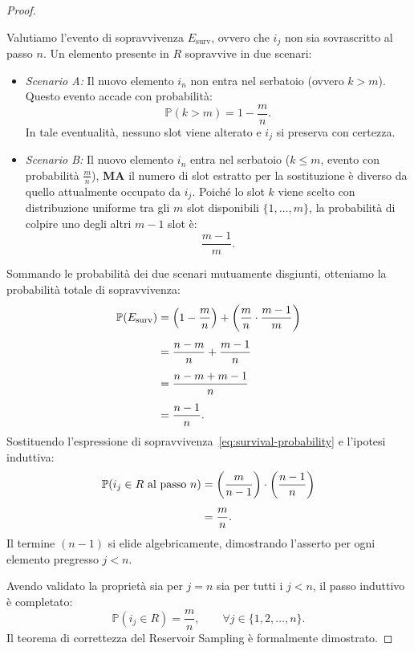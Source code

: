 \begin{proof}
\begin{itemize}
  Valutiamo l'evento di sopravvivenza $E_{\text{surv}}$, ovvero che $i_j$ non sia sovrascritto al passo $n$. Un elemento presente in $R$ sopravvive in due scenari:
  \begin{itemize}
    \item \emph{Scenario A:} Il nuovo elemento $i_n$ non entra nel serbatoio (ovvero $k > m$). Questo evento accade con probabilità:
    \begin{equation}
      \mathbb{P}(k > m) = 1 - \frac{m}{n}.
    \end{equation}
    In tale eventualità, nessuno slot viene alterato e $i_j$ si preserva con certezza.
    \item \emph{Scenario B:} Il nuovo elemento $i_n$ entra nel serbatoio ($k \le m$, evento con probabilità $\frac{m}{n}$), \textbf{MA} il numero di slot estratto per la sostituzione è diverso da quello attualmente occupato da $i_j$. Poiché lo slot $k$ viene scelto con distribuzione uniforme tra gli $m$ slot disponibili $\{1, \dots, m\}$, la probabilità di colpire uno degli altri $m - 1$ slot è:
    \begin{equation}
      \frac{m - 1}{m}.
    \end{equation}
  \end{itemize}
  Sommando le probabilità dei due scenari mutuamente disgiunti, otteniamo la probabilità totale di sopravvivenza:
  \begin{align}
    \mathbb{P}(E_{\text{surv}}) &= \left(1 - \frac{m}{n}\right) + \left(\frac{m}{n} \cdot \frac{m - 1}{m}\right) \notag\\[1ex]
    &= \frac{n - m}{n} + \frac{m - 1}{n} \notag\\[1ex]
    &= \frac{n - m + m - 1}{n} \notag\\[1ex]
    &= \frac{n - 1}{n}.
    \label{eq:survival-probability}
  \end{align}
  Sostituendo l'espressione di sopravvivenza~\eqref{eq:survival-probability} e l'ipotesi induttiva:
  \begin{align}
    \mathbb{P}(i_j \in R \text{ al passo } n) &= \left(\frac{m}{n - 1}\right) \cdot \left(\frac{n - 1}{n}\right) \notag\\[1ex]
    &= \frac{m}{n}.
  \end{align}
  Il termine $(n - 1)$ si elide algebricamente, dimostrando l'asserto per ogni elemento pregresso $j < n$.
\end{itemize}
Avendo validato la proprietà sia per $j = n$ sia per tutti i $j < n$, il passo induttivo è completato:
\begin{equation}
  \mathbb{P}(i_j \in R) = \frac{m}{n}, \qquad \forall j \in \{1, 2, \dots, n\}.
\end{equation}
Il teorema di correttezza del Reservoir Sampling è formalmente dimostrato.
\end{proof}

